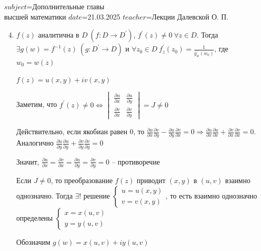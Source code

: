 $subject$=Дополнительные главы \\ высшей математики
$date$=21.03.2025
$teacher$=Лекции Далевской О. П.

\begin{enumerate}[label=\arabic*$^\circ$]
    \setcounter{enumi}{3}
    \item $f(z)$ аналитична в $D \ (f : D \longrightarrow D^\prime)$, $f^\prime(z) \neq 0 \ \forall z \in D$. 
    Тогда $\exists g(w) = f^{-1}(z) \ (g : D^\prime \longrightarrow D)$ и $\forall z_0 \in D \ f^\prime_z (z_0) = \frac{1}{g^\prime_w (w_0)}$,
    где $w_0 = w(z)$

    \begin{MyProof}
        $f(z) = u(x, y) + i v(x, y)$

        Заметим, что $f^\prime(z) \neq 0 \Longleftrightarrow 
        \begin{vmatrix}\frac{\partial u}{\partial x} & \frac{\partial u}{\partial y} \\ \frac{\partial v}{\partial x} & \frac{\partial v}{\partial y}\end{vmatrix} = J \neq 0$

        Действительно, если якобиан равен 0, то $\frac{\partial u}{\partial x} \frac{\partial v}{\partial y} - \frac{\partial u}{\partial y} \frac{\partial v}{\partial x} = 0 \Longrightarrow 
        \frac{\partial u}{\partial x} \frac{\partial u}{\partial x} + \frac{\partial v}{\partial x} \frac{\partial v}{\partial x} = 0$. Аналогично $\frac{\partial u}{\partial y} \frac{\partial u}{\partial y} + \frac{\partial v}{\partial y} \frac{\partial v}{\partial y} = 0$

        Значит, $\frac{\partial u}{\partial x} = \frac{\partial v}{\partial x} = \frac{\partial u}{\partial y} = \frac{\partial v}{\partial y} = 0$ -- противоречие

        Если $J \neq 0$, то преобразование $f(z)$ приводит $(x, y)$ в $(u, v)$ взаимно однозначно. Тогда $\exists!$ решение
        $\begin{cases}
            u = u(x, y) \\
            v = v(x, y)
        \end{cases}$, то есть взаимно однозначно определены $\begin{cases}
            x = x(u, v) \\
            y = y(u, v)
        \end{cases}$

        Обозначим $g(w) = x(u, v) + i y(u, v)$


\end{MyProof}
\end{enumerate}
